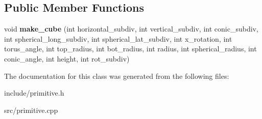 \subsection*{Public Member Functions}
\begin{DoxyCompactItemize}
\item 
\mbox{\label{classcube_a2ceeae0acbecd1a5538d3ff235d4cde8}} 
void {\bfseries make\+\_\+cube} (int horizontal\+\_\+subdiv, int vertical\+\_\+subdiv, int conic\+\_\+subdiv, int spherical\+\_\+long\+\_\+subdiv, int spherical\+\_\+lat\+\_\+subdiv, int x\+\_\+rotation, int torus\+\_\+angle, int top\+\_\+radius, int bot\+\_\+radius, int radius, int spherical\+\_\+radius, int conic\+\_\+angle, int height, int rot\+\_\+subdiv)
\end{DoxyCompactItemize}


The documentation for this class was generated from the following files\+:\begin{DoxyCompactItemize}
\item 
include/primitive.\+h\item 
src/primitive.\+cpp\end{DoxyCompactItemize}
